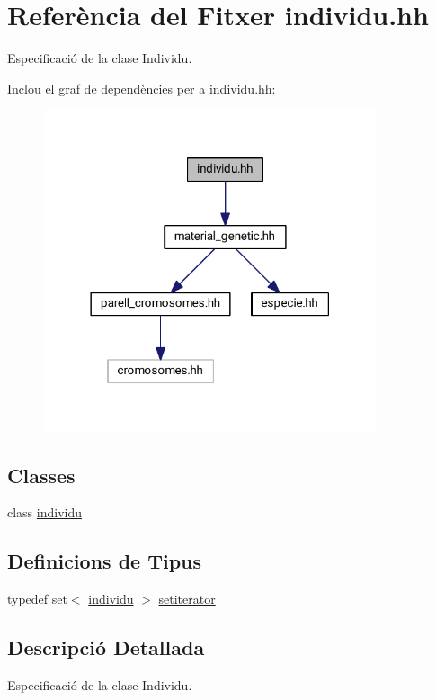 \hypertarget{individu_8hh}{}\section{Referència del Fitxer individu.\+hh}
\label{individu_8hh}


Especificació de la clase Individu.  


Inclou el graf de dependències per a individu.\+hh\+:\nopagebreak
\begin{figure}[H]
\begin{center}
\leavevmode
\includegraphics[width=278pt]{individu_8hh__incl}
\end{center}
\end{figure}
\subsection*{Classes}
\begin{DoxyCompactItemize}
\item 
class \hyperlink{classindividu}{individu}
\end{DoxyCompactItemize}
\subsection*{Definicions de Tipus}
\begin{DoxyCompactItemize}
\item 
typedef set$<$ \hyperlink{classindividu}{individu} $>$ \hyperlink{individu_8hh_a32dbccbf05588c8c12b0111d5c5c6eb3}{setiterator}
\end{DoxyCompactItemize}


\subsection{Descripció Detallada}
Especificació de la clase Individu. 



